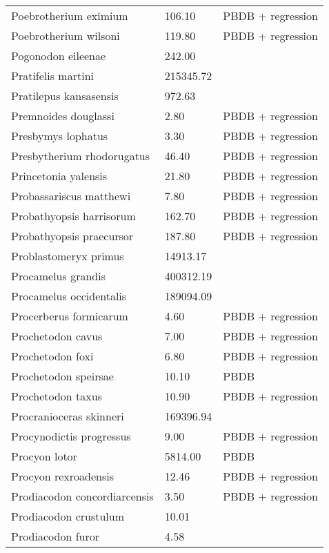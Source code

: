 \documentclass{article}
\begin{document}
\begin{center}
\begin{longtable}{p{} p{} p{}}
    Poebrotherium eximium & 106.10 & PBDB + regression \\ 
    Poebrotherium wilsoni & 119.80 & PBDB + regression \\ 
    Pogonodon eileenae & 242.00 & \cite{Fox2011b} \\ 
    Pratifelis martini & 215345.72 & \cite{Tomiya2013} \\ 
    Pratilepus kansasensis & 972.63 & \cite{Tomiya2013} \\ 
    Premnoides douglassi & 2.80 & PBDB + regression \\ 
    Presbymys lophatus & 3.30 & PBDB + regression \\ 
    Presbytherium rhodorugatus & 46.40 & PBDB + regression \\ 
    Princetonia yalensis & 21.80 & PBDB + regression \\ 
    Probassariscus matthewi & 7.80 & PBDB + regression \\ 
    Probathyopsis harrisorum & 162.70 & PBDB + regression \\ 
    Probathyopsis praecursor & 187.80 & PBDB + regression \\ 
    Problastomeryx primus & 14913.17 & \cite{Tomiya2013} \\ 
    Procamelus grandis & 400312.19 & \cite{Tomiya2013} \\ 
    Procamelus occidentalis & 189094.09 & \cite{Tomiya2013} \\ 
    Procerberus formicarum & 4.60 & PBDB + regression \\ 
    Prochetodon cavus & 7.00 & PBDB + regression \\ 
    Prochetodon foxi & 6.80 & PBDB + regression \\ 
    Prochetodon speirsae & 10.10 & PBDB \\ 
    Prochetodon taxus & 10.90 & PBDB + regression \\ 
    Procranioceras skinneri & 169396.94 & \cite{Tomiya2013} \\ 
    Procynodictis progressus & 9.00 & PBDB + regression \\ 
    Procyon lotor & 5814.00 & PBDB \\ 
    Procyon rexroadensis & 12.46 & PBDB + regression \\ 
    Prodiacodon concordiarcensis & 3.50 & PBDB + regression \\ 
    Prodiacodon crustulum & 10.01 & \cite{Lim2001} \\ 
    Prodiacodon furor & 4.58 & \cite{Scott1937} \\ 

\end{longtable}
\end{center}
\end{document}
